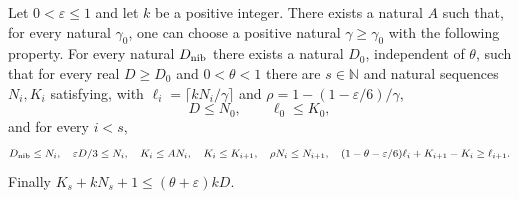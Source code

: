 \begin{lemma}
Let $0<\varepsilon\le1$ and let $k$ be a positive integer. There exists
a natural $A$ such that, for every natural $\gamma_0$, one can choose a
positive natural $\gamma\ge\gamma_0$ with the following property.
For every natural $D_{\rm nib}$ there exists a natural $D_0$, independent
of $\theta$, such that for every real $D\ge D_0$ and $0<\theta<1$
there are $s\in\mathbb N$ and natural sequences $N_i,K_i$ satisfying,
with $\ell_i=\lceil kN_i/\gamma\rceil$ and
$\rho=1-(1-\varepsilon/6)/\gamma$,
\[
D\le N_0,\qquad \ell_0\le K_0,
\]
and for every $i<s$,
\[
D_{\rm nib}\le N_i,\quad \varepsilon D/3\le N_i,\quad
K_i\le AN_i,\quad K_i\le K_{i+1},\quad
\rho N_i\le N_{i+1},\quad
(1-\theta-\varepsilon/6)\ell_i+K_{i+1}-K_i\ge\ell_{i+1}.
\]
Finally $K_s+kN_s+1\le(\theta+\varepsilon)kD$.
\end{lemma}
